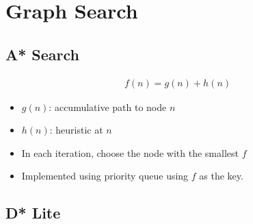 \chapter{Graph Search}

\section{A* Search}

  \begin{align}
    f\left( n \right) = g\left( n \right) + h\left( n \right)
  \end{align}

  \begin{itemize}
    \item $ g\left( n \right) $: accumulative path to node $ n $
    \item $ h\left( n \right) $: heuristic at $ n $
    \item In each iteration, choose the node with the smallest $ f $
    \item Implemented using priority queue using $ f $ as the key.
  \end{itemize}

\section{D* Lite}
